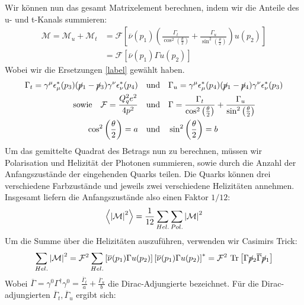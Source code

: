 Wir können nun das gesamt Matrixelement berechnen, indem wir die Anteile des u- und t-Kanals summieren:
\begin{equation}
	\begin{aligned}
	     \mathcal{M} = \mathcal{M}_u + \mathcal{M}_t &= \mathcal{F} \left[\overline{\nu}(p_1) \left(\frac{\Gamma_t}{\cos^2\left(\frac{\theta}{2}\right)}  +
	     \frac{\Gamma_u}{\sin^2\left(\frac{\theta}{2}\right)} \right) u(p_2) \right] \\
	     &= \mathcal{F} \left[ \overline{\nu}(p_1) \Gamma u(p_2)\right]
	\end{aligned}
\end{equation}
Wobei wir die Ersetzungen \autoref{label} gewählt haben.
\begin{equation}
	\begin{split}
		\Gamma_t = \gamma^\mu \epsilon^*_\mu(p_3) (\cancel{p}_1- \cancel{p}_3)  \gamma^\nu \epsilon_\nu^*(p_4) \quad &\text{und} \quad \Gamma_u = \gamma^\mu \epsilon^*_\mu(p_4) (\cancel{p}_1- \cancel{p}_4)  \gamma^\nu \epsilon_\nu^*(p_3) \\
		\text{sowie} \quad \mathcal{F} = \frac{Q_q^2e^2}{4p^2} \quad &\text{und} \quad \Gamma = \frac{\Gamma_t}{\cos^2\left(\frac{\theta}{2}\right)}  +
		\frac{\Gamma_u}{\sin^2\left(\frac{\theta}{2}\right)} \\
		\cos^2\left(\frac{\theta}{2}\right) = a \quad &\text{und} \quad \sin^2\left(\frac{\theta}{2}\right) = b
	\end{split}
\end{equation}
Um das gemittelte Quadrat des Betrags nun zu berechnen, müssen wir Polarisation und Helizität der Photonen summieren, sowie durch die Anzahl der Anfangszustände der eingehenden Quarks teilen. Die Quarks können drei verschiedene Farbzustände und jeweils zwei verschiedene Helizitäten annehmen. Insgesamt liefern die Anfangszustände also einen Faktor $1/12$:
\begin{equation}
	\left\langle  \abs{\mathcal{M}}^2\right\rangle = \frac{1}{12} \sum_{Hel.} \sum_{Pol.} \abs{\mathcal{M}}^2
\end{equation}
Um die Summe über die Helizitäten auszuführen, verwenden wir Casimirs Trick:
\begin{equation}
	\sum_{Hel.} \abs{\mathcal{M}}^2 = \mathcal{F}^2 \sum_{Hel.}  \left[ \overline{\nu}(p_1) \Gamma u(p_2)\right] \left[\overline{\nu}(p_1) \Gamma u(p_2)\right]^* = \mathcal{F}^2~\text{Tr}\left[ \Gamma \cancel{p}_2 \overline{\Gamma} \cancel{p}_1 \right]
\end{equation}
Wobei $\overline{\Gamma} = \gamma^0\Gamma^\dagger\gamma^0 = \frac{\overline{\Gamma}_t}{a} + \frac{\overline{\Gamma}_u}{b}$ die Dirac-Adjungierte bezeichnet. Für die Dirac-adjungierten $\overline{\Gamma}_t, \overline{\Gamma}_u$ ergibt sich:
